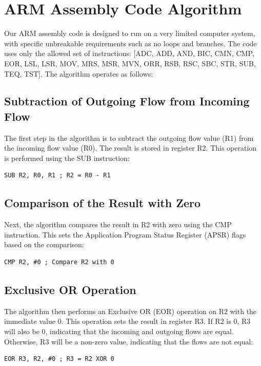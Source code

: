 \section{ARM Assembly Code Algorithm}

Our ARM assembly code is designed to run on a very limited computer system, with specific unbreakable requirements such as no loops and branches. The code uses only the allowed set of instructions: [ADC, ADD, AND, BIC, CMN, CMP, EOR, LSL, LSR, MOV, MRS, MSR, MVN, ORR, RSB, RSC, SBC, STR, SUB, TEQ, TST]. The algorithm operates as follows:

\subsection{Subtraction of Outgoing Flow from Incoming Flow}

The first step in the algorithm is to subtract the outgoing flow value (R1) from the incoming flow value (R0). The result is stored in register R2. This operation is performed using the SUB instruction:

\begin{verbatim}
SUB R2, R0, R1 ; R2 = R0 - R1
\end{verbatim}

\subsection{Comparison of the Result with Zero}

Next, the algorithm compares the result in R2 with zero using the CMP instruction. This sets the Application Program Status Register (APSR) flags based on the comparison:

\begin{verbatim}
CMP R2, #0 ; Compare R2 with 0
\end{verbatim}

\subsection{Exclusive OR Operation}

The algorithm then performs an Exclusive OR (EOR) operation on R2 with the immediate value 0. This operation sets the result in register R3. If R2 is 0, R3 will also be 0, indicating that the incoming and outgoing flows are equal. Otherwise, R3 will be a non-zero value, indicating that the flows are not equal:

\begin{verbatim}
EOR R3, R2, #0 ; R3 = R2 XOR 0
\end{verbatim}

